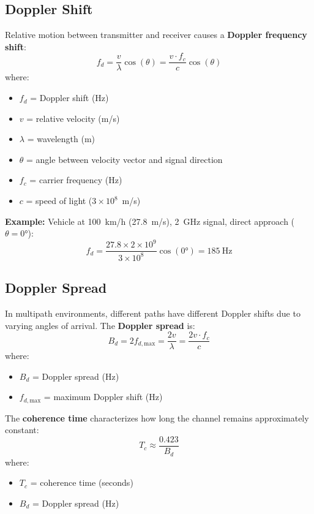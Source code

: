 \subsection{Doppler Shift}

Relative motion between transmitter and receiver causes a \textbf{Doppler frequency shift}:
\begin{equation}
f_d = \frac{v}{\lambda} \cos(\theta) = \frac{v \cdot f_c}{c} \cos(\theta)
\end{equation}
where:
\begin{itemize}
\item $f_d$ = Doppler shift (Hz)
\item $v$ = relative velocity (m/s)
\item $\lambda$ = wavelength (m)
\item $\theta$ = angle between velocity vector and signal direction
\item $f_c$ = carrier frequency (Hz)
\item $c$ = speed of light ($3 \times 10^8$~m/s)
\end{itemize}

\textbf{Example:} Vehicle at 100~km/h (27.8~m/s), 2~GHz signal, direct approach ($\theta = 0°$):
\begin{equation}
f_d = \frac{27.8 \times 2 \times 10^9}{3 \times 10^8} \cos(0°) = 185~\text{Hz}
\end{equation}

\subsection{Doppler Spread}

In multipath environments, different paths have different Doppler shifts due to varying angles of arrival. The \textbf{Doppler spread} is:
\begin{equation}
B_d = 2f_{d,\text{max}} = \frac{2v}{\lambda} = \frac{2v \cdot f_c}{c}
\end{equation}
where:
\begin{itemize}
\item $B_d$ = Doppler spread (Hz)
\item $f_{d,\text{max}}$ = maximum Doppler shift (Hz)
\end{itemize}

The \textbf{coherence time} characterizes how long the channel remains approximately constant:
\begin{equation}
T_c \approx \frac{0.423}{B_d}
\end{equation}
where:
\begin{itemize}
\item $T_c$ = coherence time (seconds)
\item $B_d$ = Doppler spread (Hz)
\end{itemize}

